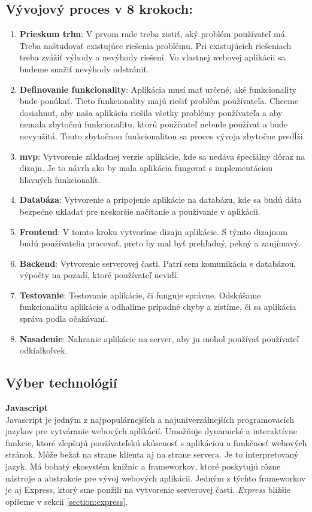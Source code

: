 \subsection{Vývojový proces v 8 krokoch:}
\begin{enumerate}
    \item \textbf{Prieskum trhu}: V prvom rade treba zistiť, aký problém používateľ má. Treba naštudovať existujúce riešenia problému. Pri existujúcich riešeniach treba zvážiť výhody a nevýhody riešení. Vo vlastnej webovej aplikácii sa budeme snažiť nevýhody odstrániť.
    \item \textbf{Definovanie funkcionality}: Aplikácia musí mať určené, aké funkcionality bude ponúkať. Tieto funkcionality majú riešiť problém používateľa. Chceme dosiahnuť, aby naša aplikácia riešila všetky problémy používateľa a aby nemala zbytočnú funkcionalitu, ktorú používateľ nebude používať a bude nevyužitá. Touto zbytočnou funkcionalitou sa proces vývoja zbytočne predĺži. 
    \item  \textbf{\acrshort{mvp}}: Vytvorenie základnej verzie aplikácie, kde sa nedáva špeciálny dôraz na dizajn. Je to návrh ako by mala aplikácia fungovať s implementáciou hlavných funkcionalít.
    \item \textbf{Databáza}: Vytvorenie a pripojenie aplikácie na databázu, kde sa budú dáta bezpećne ukladať pre neskoršie načítanie a používanie v aplikácii.
    \item \textbf{Frontend}: V tomto kroku vytvoríme dizajn aplikácie. S týmto dizajnom budú používatelia pracovať, preto by mal byť prehľadný, pekný a zaujímavý.
    \item \textbf{Backend}: Vytvorenie serverovej časti. Patrí sem komunikácia s databázou, výpočty na pozadí, ktoré používateľ nevidí.
    \item \textbf{Testovanie}: Testovanie aplikácie, či funguje správne. Odskúšame funkcionalitu aplikácie a odhalíme prípadné chyby a zistíme, či sa aplikácia správa podľa očakávaní.
    \item \textbf{Nasadenie}: Nahranie aplikácie na server, aby ju mohol používať používateľ odkialkoľvek.
\end{enumerate}


\subsection{Výber technológií}

\noindent\textbf{Javascript}\cite{javascript}\\
Javascript je jedným z najpopulárnejších a najuniverzálnejších programovacích jazykov pre vytváranie webových aplikácií. Umožňuje dynamické a interaktívne funkcie, ktoré zlepšujú používateľskú skúsenosť s aplikáciou a funkčnosť webových stránok. Môže bežať na strane klienta aj na strane servera. Je to interpretovaný jazyk. Má bohatý ekosystém knižníc a frameworkov, ktoré poskytujú rôzne nástroje a abstrakcie pre vývoj webových aplikácii. Jedným z týchto frameworkov je aj Express, ktorý sme použili na vytvorenie serverovej časti. \textit{Express} bližšie opíšeme v sekcii \ref{section:express}.\\

